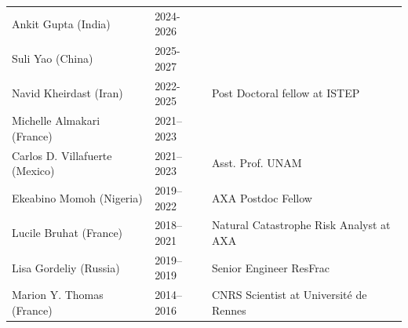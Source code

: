\documentclass[10pt]{article}
\begin{document}
\vspace{-0.5cm}
\begin{table}[h!]
 \renewcommand{\arraystretch}{0.5}

 
\begin{tabular}{L{6cm}L{2cm}D{7cm}}
\color{groy}Ankit Gupta (India)           & 2024-2026      &  \\
\color{groy}Suli Yao (China)              & 2025-2027      &  \\
\color{black}Navid Kheirdast (Iran)    	  & 2022-2025      &  Post Doctoral fellow at ISTEP\\
\color{black}Michelle Almakari (France)    & 2021–2023  &  \\
\color{black}Carlos D. Villafuerte (Mexico)   & 2021–2023  &  Asst. Prof. UNAM\\
\color{black}Ekeabino Momoh (Nigeria)   	  & 2019–2022  &  AXA Postdoc Fellow\\
\color{black}Lucile Bruhat (France)   	  & 2018–2021  &  Natural Catastrophe Risk Analyst at AXA\\
\color{black}Lisa Gordeliy (Russia)   	  & 2019–2019  &  Senior Engineer ResFrac\\
\color{black}Marion Y. Thomas (France) 	  & 2014–2016  &  CNRS Scientist at Université de Rennes\\[16pt]
\end{tabular}



\end{table}
\end{document}
